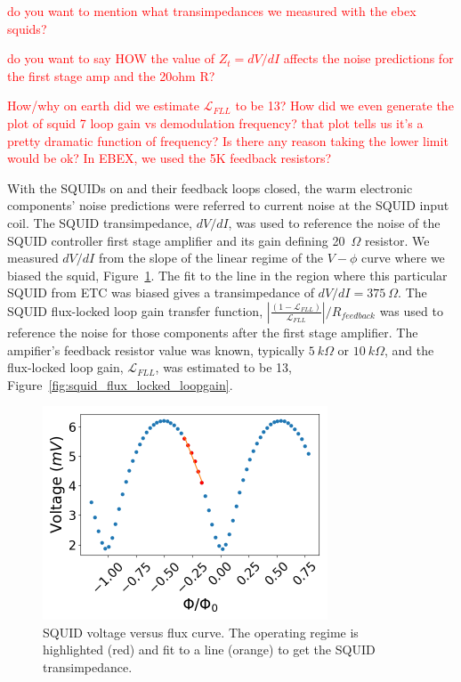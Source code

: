 \textcolor{red}{do you want to mention what transimpedances we measured with the ebex squids?}

\textcolor{red}{ do you want to say HOW the value of $Z_{t} = dV/dI$ affects the noise predictions for the first stage amp and the 20ohm R?}

\textcolor{red}{How/why on earth did we estimate $\mathscr{L}_{FLL}$ to be 13? How did we even generate the plot of squid 7 loop gain vs demodulation frequency? that plot tells us it's a pretty dramatic function of frequency? Is there any reason taking the lower limit would be ok? In EBEX, we used the 5K feedback resistors?}

With the \ac{SQUID}s on and their feedback loops closed, the warm electronic components' noise predictions were referred to current noise at the \ac{SQUID} input coil.
The \ac{SQUID} transimpedance, $dV/dI$, was used to reference the noise of the \ac{SQUID} controller first stage amplifier and its gain defining 20~$\Omega$ resistor. 
We measured $dV/dI$ from the slope of the linear regime of the $V-\phi$ curve where we biased the squid, Figure~\ref{fig:squid_transimpedance}. 
The fit to the line in the region where this particular \ac{SQUID} from \ac{ETC} was biased gives a transimpedance of $dV/dI=375~\Omega$. 
The \ac{SQUID} flux-locked loop gain transfer function, $|\frac{(1-\mathscr{L}_{FLL})}{\mathscr{L}_{FLL}}|/R_{feedback}$ was used to reference the noise for those components after the first stage amplifier. 
The ampifier's feedback resistor value was known, typically $5~k\Omega$ or $10~k\Omega$, and the flux-locked loop gain, $\mathscr{L}_{FLL}$, was estimated to be 13, Figure~\ref{fig:squid_flux_locked_loopgain}. 

\begin{figure}[ht!]
\begin{center}
\includegraphics[height=2.5in]{figures/vphi_physical.png}
\caption{\ac{SQUID} voltage versus flux curve. The operating regime is highlighted (red) and fit to a line (orange) to get the \ac{SQUID} transimpedance.
\label{fig:squid_transimpedance} }
\end{center}
\end{figure}

